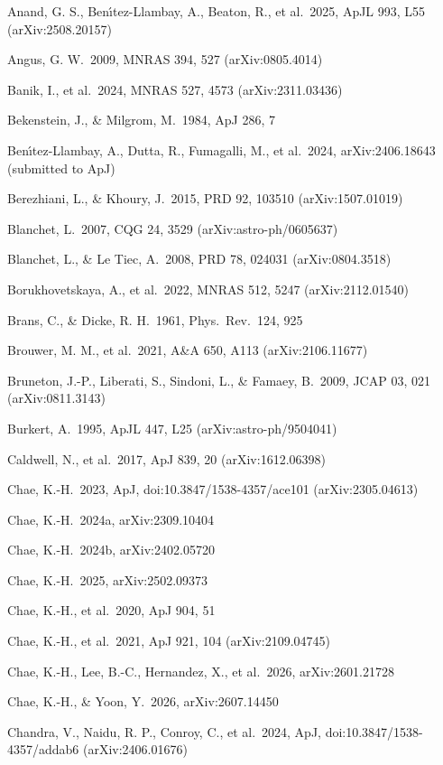 \documentclass[
  10pt,
]{article}
\begin{document}
{\small
\begin{list}{}{\setlength{\leftmargin}{1.5em}\setlength{\itemindent}{-1.5em}\setlength{\itemsep}{1pt}\setlength{\parsep}{0pt}}
\item Anand, G. S., Ben\'{\i}tez-Llambay, A., Beaton, R., et al.\ 2025, ApJL 993, L55 (arXiv:2508.20157)
\item Angus, G. W.\ 2009, MNRAS 394, 527 (arXiv:0805.4014)
\item Banik, I., et al.\ 2024, MNRAS 527, 4573 (arXiv:2311.03436)
\item Bekenstein, J., \& Milgrom, M.\ 1984, ApJ 286, 7
\item Ben\'{\i}tez-Llambay, A., Dutta, R., Fumagalli, M., et al.\ 2024, arXiv:2406.18643 (submitted to ApJ)
\item Berezhiani, L., \& Khoury, J.\ 2015, PRD 92, 103510 (arXiv:1507.01019)
\item Blanchet, L.\ 2007, CQG 24, 3529 (arXiv:astro-ph/0605637)
\item Blanchet, L., \& Le Tiec, A.\ 2008, PRD 78, 024031 (arXiv:0804.3518)
\item Borukhovetskaya, A., et al.\ 2022, MNRAS 512, 5247 (arXiv:2112.01540)
\item Brans, C., \& Dicke, R. H.\ 1961, Phys.\ Rev.\ 124, 925
\item Brouwer, M. M., et al.\ 2021, A\&A 650, A113 (arXiv:2106.11677)
\item Bruneton, J.-P., Liberati, S., Sindoni, L., \& Famaey, B.\ 2009, JCAP 03, 021 (arXiv:0811.3143)
\item Burkert, A.\ 1995, ApJL 447, L25 (arXiv:astro-ph/9504041)
\item Caldwell, N., et al.\ 2017, ApJ 839, 20 (arXiv:1612.06398)
\item Chae, K.-H.\ 2023, ApJ, doi:10.3847/1538-4357/ace101 (arXiv:2305.04613)
\item Chae, K.-H.\ 2024a, arXiv:2309.10404
\item Chae, K.-H.\ 2024b, arXiv:2402.05720
\item Chae, K.-H.\ 2025, arXiv:2502.09373
\item Chae, K.-H., et al.\ 2020, ApJ 904, 51
\item Chae, K.-H., et al.\ 2021, ApJ 921, 104 (arXiv:2109.04745)
\item Chae, K.-H., Lee, B.-C., Hernandez, X., et al.\ 2026, arXiv:2601.21728
\item Chae, K.-H., \& Yoon, Y.\ 2026, arXiv:2607.14450
\item Chandra, V., Naidu, R. P., Conroy, C., et al.\ 2024, ApJ, doi:10.3847/1538-4357/addab6 (arXiv:2406.01676)

\end{list}}
\end{document}
